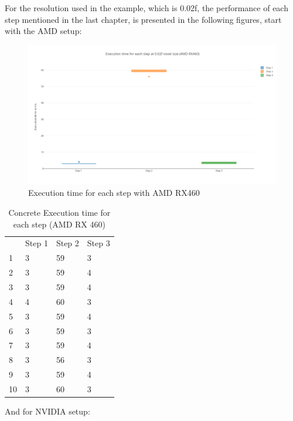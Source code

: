 For the resolution used in the example, which is 0.02f, the performance of each step mentioned in the last chapter, is presented in the following figures, start with the AMD setup:

\begin{figure}[H]
	\centering
	\includegraphics[width=14cm]{images/EachstepAMD.png}
	\caption{Execution time for each step with AMD RX460}
	\label{ExampleOCTImage}
\end{figure}

\newpage
\begin{table}[H]
\centering
\caption{Concrete Execution time for each step (AMD RX 460)}
\begin{tabular}{llll}
   & Step 1 & Step 2 & Step 3 \\
1  & 3      & 59     & 3      \\
2  & 3      & 59     & 4      \\
3  & 3      & 59     & 4      \\
4  & 4      & 60     & 3      \\
5  & 3      & 59     & 4      \\
6  & 3      & 59     & 3      \\
7  & 3      & 59     & 4      \\
8  & 3      & 56     & 3      \\
9  & 3      & 59     & 4      \\
10 & 3      & 60     & 3     
\end{tabular}
\end{table}
And for NVIDIA setup:

